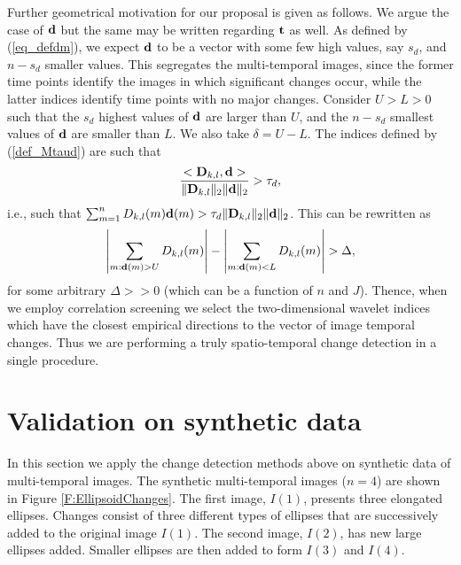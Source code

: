 \documentclass[journal]{IEEEtran}
\newcommand{\vD}{{\textbf D}}
\newcommand{\vd}{{\textbf d}}
\newcommand{\vt}{{\textbf t}}
\begin{document}
Further geometrical motivation for our proposal is given as follows.  We argue the case of $\vd$ but the same may be written regarding $\vt$ as well. As defined by (\ref{eq_defdm}), we expect $\vd$ to be a vector with some few high values, say $s_d$, and $n-s_d$ smaller values. This segregates the multi-temporal images, since the former time points identify the images in which significant changes occur, while the latter indices identify time points with no major changes. Consider $U>L>0$ such that the $s_d$ highest values of $\vd$ are larger than $U$, and the $n-s_d$ smallest values of $\vd$ are smaller than $L$. We also take $\delta=U-L$. The indices defined by  (\ref{def_Mtaud}) are such that   
\[
\frac{<\vD_{k,l},\vd>}{\|\vD_{k,l}\|_2\|\vd\|_2}>\tau_d,
\]
i.e., such that  $\sum_{m=1}^nD_{k,l}(m)\vd(m)>\tau_d\|\vD_{k,l}\|_2\|\vd\|_2$. This can be rewritten as
\[
\left|\sum_{m:\vd(m)>U} D_{k,l}(m)\right|-\left|\sum_{m:\vd(m)<L} D_{k,l}(m)\right|>\Delta,
\]
for some arbitrary $\Delta>>0$ (which can be a function of $n$ and $J$). Thence, when we employ correlation screening we select the two-dimensional wavelet indices which have the closest empirical directions to the vector of image temporal changes. Thus we are performing a truly spatio-temporal change detection in a single procedure.




\section{Validation on synthetic data}\label{section_validation}

In this section we apply the change detection methods above on synthetic data of multi-temporal images. 
The synthetic multi-temporal images ($n=4$) are shown in Figure \ref{F:EllipsoidChanges}. The first image, $I(1)$, presents three elongated ellipses. Changes consist of three different types of ellipses that are successively added to the original image $I(1)$. The second image, $I(2)$, has new large ellipses added. Smaller ellipses are then added to form $I(3)$ and $I(4)$. 
\end{document}
